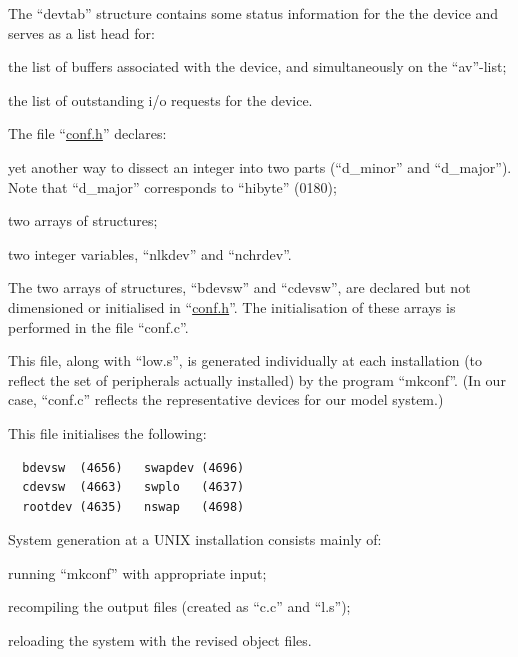 The ``devtab'' structure contains some
status information for the the device
and serves as a list head for:

\bd
\item[(a)] the list of buffers associated
 with the device, and simultaneously on the ``av''-list;

\item[(b)] the list of outstanding i/o
 requests for the device.
\ed


The file ``\href{./v6/conf.h}{conf.h}'' declares:

\bi
\item yet another way to dissect an
integer into two parts (``d\_minor''
and ``d\_major''). Note that
``d\_major'' corresponds to ``hibyte'' (0180);

\item two arrays of structures;

\item two integer variables, ``nlkdev''
and ``nchrdev''.
\ei

The two arrays of structures, ``bdevsw''
and ``cdevsw'', are declared but not
dimensioned or initialised in ``\href{./v6/conf.h}{conf.h}''.
The initialisation of these arrays is
performed in the file ``conf.c''.


This file, along with ``low.s'', is generated individually at each installation (to reflect the set of peripherals
actually installed) by the program
``mkconf''. (In our case, ``conf.c''
reflects the representative devices for
our model system.)

This file initialises the following:

\begin{verbatim}
  bdevsw  (4656)   swapdev (4696)
  cdevsw  (4663)   swplo   (4637)
  rootdev (4635)   nswap   (4698)
\end{verbatim}


System generation at a UNIX installation consists mainly of:

\bi
\item running ``mkconf'' with appropriate
 input;

\item recompiling the output files (created
as ``c.c'' and ``l.s'');

\item reloading the system with the revised
 object files.
\ei


